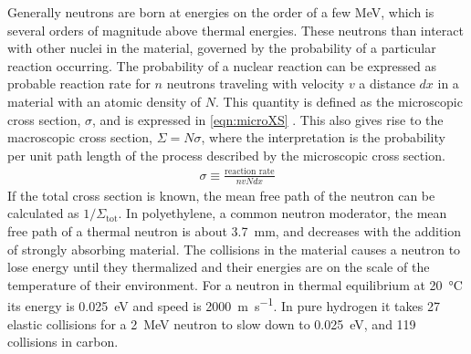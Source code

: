 Generally neutrons are born at energies on the order of a few MeV, which is several orders of magnitude above thermal energies.
These neutrons than interact with other nuclei in the material, governed by the probability of a particular reaction occurring.
The probability of a nuclear reaction can be expressed as probable reaction rate for $n$ neutrons traveling with velocity $v$ a distance $dx$ in a material with an atomic density of $N$.
This quantity is  defined as the microscopic cross section, $\sigma$, and is expressed in \eqref{eqn:microXS} .
This also gives rise to the macroscopic cross section, $\Sigma=N\sigma$, where the interpretation is the probability per unit path length of the process described by the microscopic cross section.
\begin{align}
	\label{eqn:microXS}
	\sigma \equiv \frac{\text{reaction rate}}{nvNdx}
\end{align}
If the total cross section is known, the mean free path of the neutron can be calculated as $1/\Sigma_\text{tot}$.
In polyethylene, a common neutron moderator, the mean free path of a thermal neutron is about \SI{3.7}{\mm}, and decreases with the addition of strongly absorbing material.
The collisions in the material causes a neutron to lose energy until they thermalized and their energies are on the scale of the temperature of their environment.
For a neutron in thermal equilibrium at \SI{20}{\degreeCelsius} its energy is \SI{0.025}{\eV} and speed is \SI{2000}{\m\per\second}.
In pure hydrogen it takes 27 elastic collisions for a \SI{2}{\MeV} neutron to slow down to \SI{0.025}{\electronvolt}, and 119 collisions in carbon.

